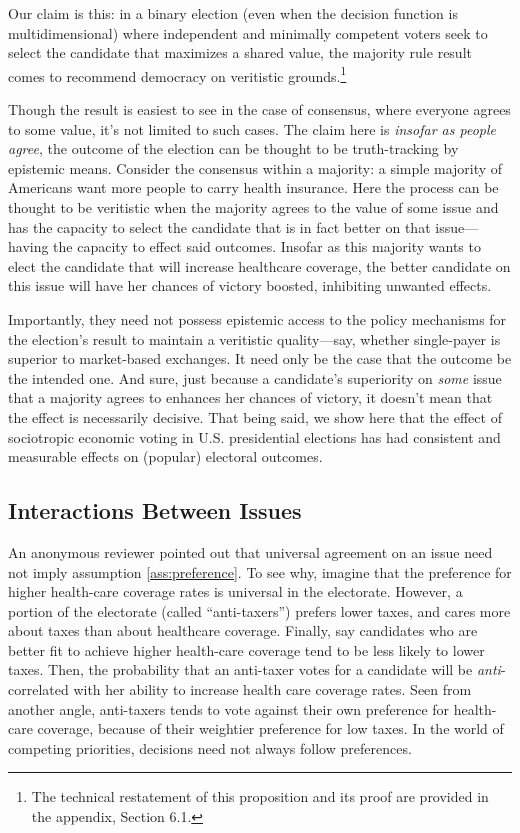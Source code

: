 \documentclass[11pt]{article}
\begin{document}
Our claim is this: in a binary election (even when the decision function is multidimensional) where independent and minimally competent voters seek to select the candidate that maximizes a shared value, the majority rule result comes to recommend democracy on veritistic grounds.\footnote{The technical restatement of this proposition and its proof are provided in the appendix, Section 6.1.}

Though the result is easiest to see in the case of consensus, where everyone agrees to some value, it's not limited to such cases. The claim here is \emph{insofar as people agree}, the outcome of the election can be thought to be truth-tracking by epistemic means.  Consider the consensus within a majority: a simple majority of Americans want more people to carry health insurance.
 Here the process can be thought to be veritistic when the majority agrees to the value of some issue and has the capacity to select the candidate that is in fact better on that issue---having the capacity to effect said outcomes. Insofar as this majority wants to elect the candidate that will increase healthcare coverage, the better candidate on this issue will have her chances of victory boosted, inhibiting unwanted effects. 
 
Importantly, they need not possess epistemic access to the policy mechanisms for the election's result to maintain a veritistic quality---say, whether single-payer is superior to market-based exchanges. It need only be the case that the outcome be the intended one. And sure, just because a candidate's superiority on \emph{some} issue that a majority agrees to enhances her chances of victory, it doesn't mean that the effect is necessarily decisive. That being said, we show here that the effect of sociotropic economic voting in U.S. presidential elections  has had consistent and measurable  effects on (popular) electoral outcomes.

\subsection{Interactions Between Issues}
An anonymous reviewer pointed out that universal agreement on an issue
need not imply assumption \ref{ass:preference}.
To see why, imagine that the preference for higher health-care
coverage rates is universal in the electorate.
However, a portion of the electorate (called ``anti-taxers'') prefers
lower taxes, and cares more about taxes than about healthcare coverage. 
Finally, say candidates who are better fit to achieve higher health-care
coverage tend to be less likely to lower taxes.
Then, the probability that an anti-taxer votes for a candidate will
be \emph{anti}-correlated with her ability to increase health care
coverage rates. 
Seen from another angle, anti-taxers tends to vote
against their own preference for health-care coverage, because of their
weightier preference for low taxes.
In the world of competing priorities, decisions need not always follow
preferences. 
\end{document}
